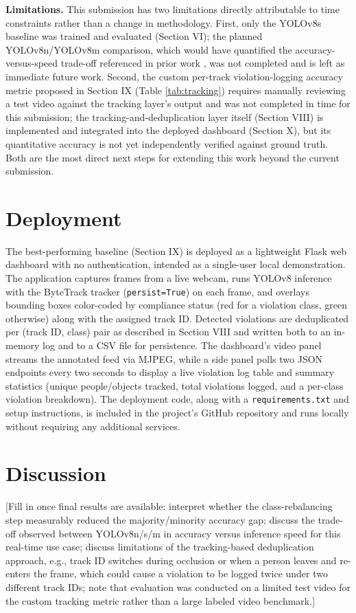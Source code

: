 \documentclass[conference]{IEEEtran}
\begin{document}
\textbf{Limitations.} This submission has two limitations directly attributable to time constraints rather than a change in methodology. First, only the YOLOv8s baseline was trained and evaluated (Section VI); the planned YOLOv8n/YOLOv8m comparison, which would have quantified the accuracy-versus-speed trade-off referenced in prior work \cite{b3}, was not completed and is left as immediate future work. Second, the custom per-track violation-logging accuracy metric proposed in Section IX (Table \ref{tab:tracking}) requires manually reviewing a test video against the tracking layer's output and was not completed in time for this submission; the tracking-and-deduplication layer itself (Section VIII) is implemented and integrated into the deployed dashboard (Section X), but its quantitative accuracy is not yet independently verified against ground truth. Both are the most direct next steps for extending this work beyond the current submission.

\section{Deployment}

The best-performing baseline (Section IX) is deployed as a lightweight Flask web dashboard with no authentication, intended as a single-user local demonstration. The application captures frames from a live webcam, runs YOLOv8 inference with the ByteTrack tracker (\texttt{persist=True}) on each frame, and overlays bounding boxes color-coded by compliance status (red for a violation class, green otherwise) along with the assigned track ID. Detected violations are deduplicated per (track ID, class) pair as described in Section VIII and written both to an in-memory log and to a CSV file for persistence. The dashboard's video panel streams the annotated feed via MJPEG, while a side panel polls two JSON endpoints every two seconds to display a live violation log table and summary statistics (unique people/objects tracked, total violations logged, and a per-class violation breakdown). The deployment code, along with a \texttt{requirements.txt} and setup instructions, is included in the project's GitHub repository and runs locally without requiring any additional services.

\section{Discussion}

[Fill in once final results are available: interpret whether the class-rebalancing step measurably reduced the majority/minority accuracy gap; discuss the trade-off observed between YOLOv8n/s/m in accuracy versus inference speed for this real-time use case; discuss limitations of the tracking-based deduplication approach, e.g., track ID switches during occlusion or when a person leaves and re-enters the frame, which could cause a violation to be logged twice under two different track IDs; note that evaluation was conducted on a limited test video for the custom tracking metric rather than a large labeled video benchmark.]
\end{document}
